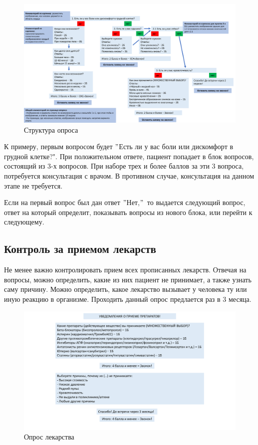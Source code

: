 \documentclass[a4paper,12pt]{article}
\begin{document}
	\begin{figure}[h]
		\includegraphics[scale=0.175]{images/presentation/1cbc101521d4d97c799189ce193d279d-0}
		\caption{Структура опроса}\label{fig:figure}
	\end{figure}

	К примеру, первым вопросом будет \("\)Есть ли у вас боли или дискомфорт в грудной клетке?". При положительном ответе, пациент попадает в блок вопросов, состоящий из 3-х вопросов.  При наборе трех и более баллов за эти 3 вопроса, потребуется консультация с врачом. В противном случае, консультация на данном этапе не требуется. \par
	Если на первый вопрос был дан ответ \("\)Нет,\("\)\, то выдается следующий вопрос, ответ на который определит, показывать вопросы из нового блока, или перейти к следующему.

	\subsection{Контроль за приемом лекарств}

	Не менее важно контролировать прием всех прописанных лекарств.
	Отвечая на вопросы, можно определить, какие из них пациент не принимает, а также узнать саму причину. Можно определить, какое лекарство вызывает у человека ту или иную реакцию в организме. Проходить данный опрос предлается раз в 3 месяца.

	\begin{figure}[h]
		\includegraphics[scale=0.175]{images/presentation/1cbc101521d4d97c799189ce193d279d-1}
		\caption{Опрос лекарства}\label{fig:figure2}
	\end{figure}
\end{document}
